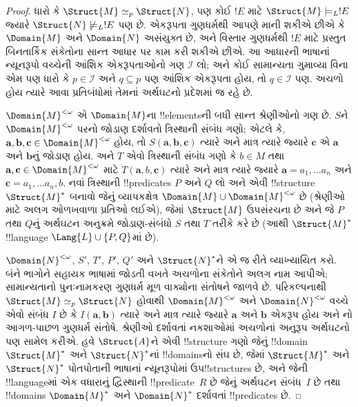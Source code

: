 \documentclass[../../../include/open-logic-section]{subfiles}
\begin{document}
\begin{proof}
ધારો કે $\Struct{M} \simeq_p \Struct{N}$, પણ કોઈ $!E$ માટે
$\Struct{M} \models_L !E$ જ્યારે $\Struct{N} \not\models_L !E$ પણ છે.
એકરૂપતા ગુણધર્મથી આપણે માની શકીએ છીએ કે $\Domain{M}$ અને $\Domain{N}$
અસંયુક્ત છે, અને વિસ્તાર ગુણધર્મથી $!E$ માટે પ્રસ્તુત બિનતાર્કિક
સંકેતોના સાન્ત આધાર પર કામ કરી શકીએ છીએ. આ આધારની ભાષાનાં ન્યૂનરૂપો
વચ્ચેની આંશિક એકરૂપતાઓનો ગણ $\mathcal{I}$ લો; અને કોઈ
સામાન્યતા ગુમાવ્યા વિના એમ પણ ધારો કે $p \in \mathcal{I}$ અને $q
\subseteq p$ પણ આંશિક એકરૂપતા હોય, તો $q \in \mathcal{I}$ પણ.
અચળો હોય ત્યારે આવા પ્રતિબંધોમાં તેમનાં અર્થઘટનો પ્રદેશમાં જ રહે છે.

$\Domain{M}^{<\omega}$ એ $\Domain{M}$ના !!{element}sની બધી સાન્ત
શ્રેણીઓનો ગણ છે. $S$ને $\Domain{M}^{<\omega}$ પરનો જોડાણ દર્શાવતો
ત્રિસ્થાની સંબંધ ગણો; એટલે કે, $\mathbf{a}, \mathbf{b}, \mathbf{c}
\in \Domain{M}^{<\omega}$ હોય, તો $S(\mathbf{a}, \mathbf{b},
\mathbf{c})$ ત્યારે અને માત્ર ત્યારે જ્યારે $\mathbf{c}$ એ
$\mathbf{a}$ અને $\mathbf{b}$નું જોડાણ હોય. અને $T$ એવો ત્રિસ્થાની
સંબંધ ગણો કે $b \in M$ તથા $\mathbf{a}, \mathbf{c} \in
\Domain{M}^{<\omega}$ માટે $T(\mathbf{a}, b, \mathbf{c})$ ત્યારે અને
માત્ર ત્યારે જ્યારે $\mathbf{a} = a_1, \dots a_n$ અને
$\mathbf{c} = a_1, \dots a_n, b$. નવાં ત્રિસ્થાની !!{predicate}s
$P$ અને $Q$ લો અને એવી !!{structure} $\Struct{M}^*$ બનાવો જેનું
વ્યાપકક્ષેત્ર $\Domain{M} \cup \Domain{M}^{<\omega}$ છે (શ્રેણીઓ માટે
અલગ ઓળખવાળા પ્રતિઓ લઈએ), જેમાં
$\Struct{M}$ ઉપસંરચના છે અને જે $P$ તથા $Q$નું અર્થઘટન અનુક્રમે
જોડાણ-સંબંધો $S$ તથા $T$ તરીકે કરે છે (આથી $\Struct{M}^*$ !!{language}
$\Lang{L} \cup \{ P, Q\}$માં છે).

$\Domain{N}^{<\omega}$, $S'$, $T'$, $P'$, $Q'$ અને
$\Struct{N}^*$ને એ જ રીતે વ્યાખ્યાયિત કરો. બંને ભાગોને સહાયક ભાષામાં
જોડતી વખતે અચળોના સંકેતોને અલગ નામ આપીએ; સામાન્યતાનો પુનઃનામકરણ
ગુણધર્મ મૂળ વાક્યોના સંતોષને જાળવે છે. પરિકલ્પનાથી $\Struct{M}
\simeq_p \Struct{N}$ હોવાથી $\Domain{M}^{<\omega}$ અને
$\Domain{N}^{<\omega}$ વચ્ચે એવો સંબંધ $I$ છે કે
$I(\mathbf{a}, \mathbf{b})$ ત્યારે અને માત્ર ત્યારે જ્યારે
$\mathbf{a}$ અને $\mathbf{b}$ એકરૂપ હોય અને
નો આગળ-પાછળ ગુણધર્મ સંતોષે.
શ્રેણીઓ દર્શાવતાં નકશાઓમાં અચળોનાં અનુરૂપ અર્થઘટનો પણ સામેલ કરીએ. હવે
$\Struct{A}$ને એવી !!{structure} ગણો જેનું !!{domain}
$\Struct{M}^*$ અને $\Struct{N}^*$નાં !!{domain}sનો સંઘ છે, જેમાં
$\Struct{M}^*$ અને $\Struct{N}^*$ પોતપોતાની ભાષાનાં ન્યૂનરૂપોમાં
ઉપ!!{structure}s છે, અને જેની
!!{language}માં એક વધારાનું દ્વિસ્થાની !!{predicate}~$R$ છે જેનું
અર્થઘટન સંબંધ~$I$ છે તથા !!{domain}s $\Domain{M}^*$ અને $\Domain{N}^*$ દર્શાવતાં
!!{predicate}s છે.


\end{proof}
\end{document}
